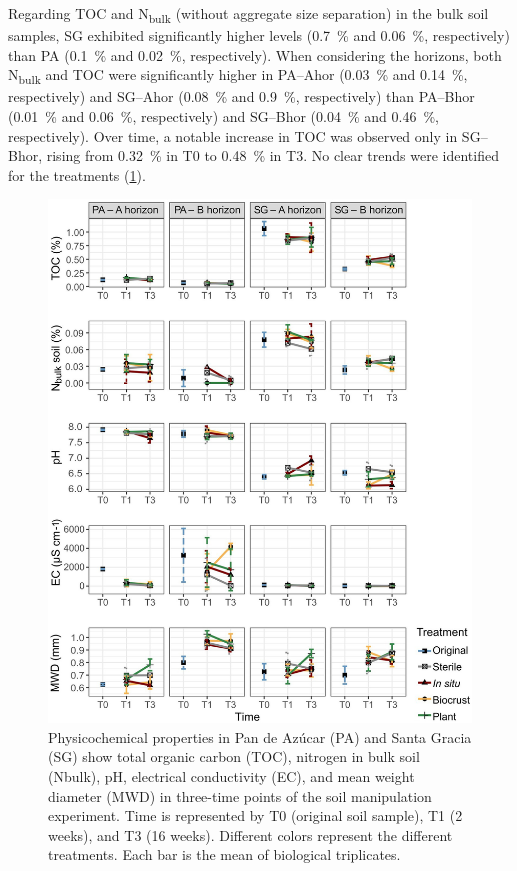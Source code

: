Regarding TOC and N\textsubscript{bulk} (without aggregate size separation) in the bulk soil samples, SG exhibited significantly higher levels (\SI{0.7}{\percent} and \SI{0.06}{\percent}, respectively) than PA (\SI{0.1}{\percent} and \SI{0.02}{\percent}, respectively). When considering the horizons, both N\textsubscript{bulk} and TOC were significantly higher in PA--Ahor (\SI{0.03}{\percent} and \SI{0.14}{\percent}, respectively) and SG--Ahor (\SI{0.08}{\percent} and \SI{0.9}{\percent}, respectively) than PA--Bhor (\SI{0.01}{\percent} and \SI{0.06}{\percent}, respectively) and SG--Bhor (\SI{0.04}{\percent} and \SI{0.46}{\percent}, respectively). Over time, a notable increase in TOC was observed only in SG--Bhor, rising from \SI{0.32}{\percent} in T0 to \SI{0.48}{\percent} in T3. No clear trends were identified for the treatments (\ref{fig:M3-F2}).

\begin{figure}[H]
	\centering
	\includegraphics[width=1\textwidth]{img/M3-Figure_2.jpg}
	\caption{Physicochemical properties in Pan de Azúcar (PA) and Santa Gracia (SG) show total organic carbon (TOC), nitrogen in bulk soil (Nbulk), pH, electrical conductivity (EC), and mean weight diameter (MWD) in three-time points of the soil manipulation experiment. Time is represented by T0 (original soil sample), T1 (2 weeks), and T3 (16 weeks). Different colors represent the different treatments. Each bar is the mean of biological triplicates.}
	\label{fig:M3-F2}
\end{figure}

